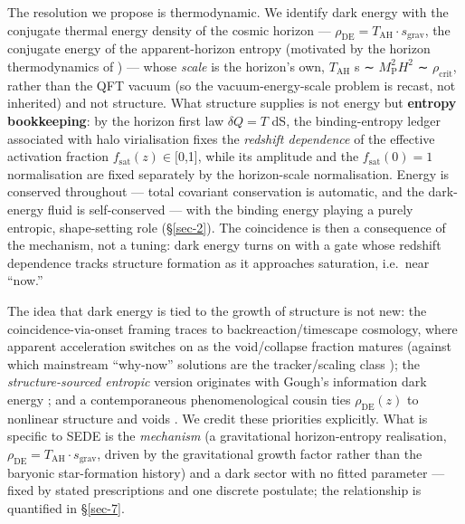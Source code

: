 \documentclass[preprint,12pt]{elsarticle}
\begin{document}
The resolution we propose is thermodynamic. We identify dark energy with
the conjugate thermal energy density of the cosmic horizon ---
\(\rho _\mathrm{DE} = T_\mathrm{AH}\cdot s_{\mathrm{grav}}\), the
conjugate energy of the apparent-horizon entropy (motivated by the
horizon thermodynamics of \citep{Jacobson:1995ab, Cai:2005ra}) --- whose
\emph{scale} is the horizon's own, \(T_\mathrm{AH}\) s ∼
\(M_{\mathrm{P}}^{2}H^{2}\) ∼ \(\rho _{\mathrm{crit}}\), rather than the
QFT vacuum (so the vacuum-energy-scale problem is recast, not inherited)
and not structure. What structure supplies is not energy but
\textbf{entropy bookkeeping}: by the horizon first law \(\delta Q = T\)
dS, the binding-entropy ledger associated with halo virialisation fixes
the \emph{redshift dependence} of the effective activation fraction
\(f_{\mathrm{sat}}(z) \in  [0\),1{]}, while its amplitude and the
\(f_{\mathrm{sat}}(0) = 1\) normalisation are fixed separately by the
horizon-scale normalisation. Energy is conserved throughout --- total
covariant conservation is automatic, and the dark-energy fluid is
self-conserved --- with the binding energy playing a purely entropic,
shape-setting role (§\ref{sec-2}). The coincidence is then a consequence
of the mechanism, not a tuning: dark energy turns on with a gate whose
redshift dependence tracks structure formation as it approaches
saturation, i.e.~near ``now.''

The idea that dark energy is tied to the growth of structure is not new:
the coincidence-via-onset framing traces to backreaction/timescape
cosmology, where apparent acceleration switches on as the void/collapse
fraction matures \citep{Rasanen:2006kp, Wiltshire:2011ba, Kolb:2005da}
(against which mainstream ``why-now'' solutions are the tracker/scaling
class \citep{Zlatev:1998yg}); the \emph{structure-sourced entropic}
version originates with Gough's information dark energy
\citep{Gough2008, Gough:2011eq, Gough2025}; and a contemporaneous
phenomenological cousin ties \(\rho _\mathrm{DE}(z)\) to nonlinear
structure and voids \citep{Camlibel:2026sjd}. We credit these priorities
explicitly. What is specific to SEDE is the \emph{mechanism} (a
gravitational horizon-entropy realisation,
\(\rho _\mathrm{DE} = T_\mathrm{AH}\cdot s_{\mathrm{grav}}\), driven by
the gravitational growth factor rather than the baryonic star-formation
history) and a dark sector with no fitted parameter --- fixed by stated
prescriptions and one discrete postulate; the relationship is quantified
in §\ref{sec-7}.
\end{document}
